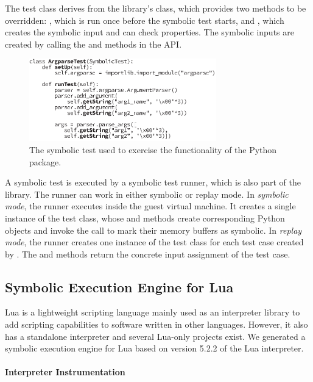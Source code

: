 The test class derives from the library's  class, which provides two methods to be overridden: , which is run once before the symbolic test starts, and , which creates the symbolic input and can check properties.  The symbolic inputs are created by calling the  and  methods in the  API.

\begin{figure}
  \centering
  \includegraphics[width=3.2in]{figures/evaluation/symtest}
  \caption{The symbolic test used to exercise the functionality of the Python  package.}
  \label{fig:sample-test}
\end{figure}

A symbolic test is executed by a symbolic test runner, which is also part of the library.  The runner can work in either symbolic or replay mode. 
%
In \emph{symbolic mode}, the runner executes inside the guest virtual machine.  It creates a single instance of the test class, whose  and  methods create corresponding Python objects and invoke the  call to mark their memory buffers as symbolic.
%
In \emph{replay mode}, the runner creates one instance of the test class for each test case created by \chef. The  and  methods return the concrete input assignment of the test case.


\subsection{Symbolic Execution Engine for Lua}
\label{sec:eval:lua-proto}

Lua is a lightweight scripting language mainly used as an interpreter library to add scripting capabilities to software written in other languages. However, it also has a standalone interpreter and several Lua-only projects exist. We generated a symbolic execution engine for Lua based on version 5.2.2 of the Lua interpreter.

\paragraph{Interpreter Instrumentation}

